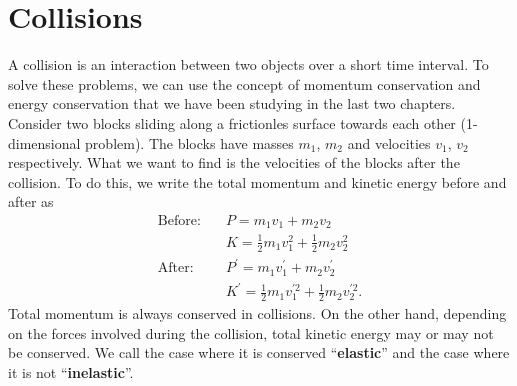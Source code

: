 \documentclass[../classical_mechanics.tex]{subfiles}
\begin{document}
    \section{Collisions}\label{sec:collisions}
        A collision is an interaction between two objects over a short time interval.
        To solve these problems, we can use the concept of momentum conservation and energy conservation that we have been studying in the last two chapters.
        Consider two blocks sliding along a frictionles surface towards each other (1-dimensional problem).
        The blocks have masses $m_1$, $m_2$ and velocities $v_1$, $v_2$ respectively.
        What we want to find is the velocities of the blocks after the collision.
        To do this, we write the total momentum and kinetic energy before and after as
        \begin{align}
            \text{Before:}\quad&P=m_1v_1+m_2v_2\\
            & K=\frac{1}{2}m_1v_1^2+\frac{1}{2}m_2v_2^2\\
            \text{After:}\quad&P^\prime=m_1v_1^\prime+m_2v_2^\prime\\
            & K^\prime=\frac{1}{2}m_1v_1^{\prime 2}+\frac{1}{2}m_2v_2^{\prime 2}.
        \end{align}
        Total momentum is always conserved in collisions.
        On the other hand, depending on the forces involved during the collision, total kinetic energy may or may not be conserved.
        We call the case where it is conserved ``\textbf{elastic}'' and the case where it is not ``\textbf{inelastic}''. 
\end{document}

